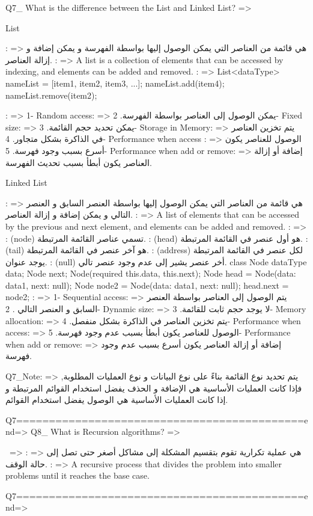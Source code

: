 Q7_ What is the difference between the List and Linked List? =>{                          
    List{
        \Arabic: => هي قائمة من العناصر التي يمكن الوصول إليها بواسطة الفهرسة و يمكن إضافة و إزالة العناصر.
        \English: => A list is a collection of elements that can be accessed by indexing, and elements can be added and removed.
        \code: => {
                List<dataType> nameList = [item1, item2, item3, ...];
                nameList.add(item4);
                nameList.remove(item2);
        }

        \Features: => {
            1- Random access: => يمكن الوصول إلى العناصر بواسطة الفهرسة.
            2- Fixed size: => يمكن تحديد حجم القائمة.
            3- Storage in Memory: => يتم تخزين العناصر في الذاكرة بشكل متجاور. 
            4- Performance when access : => الوصول للعناصر يكون أسرع بسبب وجود فهرسة.
            5- Performance when add or remove: => إضافة أو إزالة العناصر يكون أبطأ بسبب تحديث الفهرسة.
        }
    }
    Linked List {
        \Arabic: => هي قائمة من العناصر التي يمكن الوصول إليها بواسطة العنصر السابق و العنصر التالي و يمكن إضافة و إزالة العناصر.
        \English: => A list of elements that can be accessed by the previous and next element, and elements can be added and removed.
        \code: =>{
            \note\1: (node)  تسمي عناصر القائمة المرتبطة.
            \note\2: (head) هو أول عنصر في القائمة المرتبطة. 
            \note\3: (tail) هو آخر عنصر في القائمة المرتبطة.
            \note\4: (address) لكل عنصر في القائمة المرتبطة يوجد عنوان.
            \note\5: (null) أخر عنصر يشير إلى عدم وجود عنصر تالي. 
            class Node {
                dataType data;
                Node next;
                Node({required this.data, this.next});
            }
            Node head = Node({data: data1, next: null});
            Node node2 = Node({data: data1, next: null});
            head.next = node2;
        }
        \Features: => {
            1- Sequential access: => يتم الوصول إلى العناصر بواسطة العنصر السابق و العنصر التالي .
            2- Dynamic size: => لا يوجد حجم ثابت للقائمة.
            3- Memory allocation: => يتم تخزين العناصر في الذاكرة بشكل منفصل.
            4- Performance when access: => الوصول للعناصر يكون أبطأ بسبب عدم وجود فهرسة.
            5- Performance when add or remove: => إضافة أو إزالة العناصر يكون أسرع بسبب عدم وجود فهرسة.
        }

        Q7_Note: => يتم تحديد نوع القائمة بناءً على نوع البيانات و نوع العمليات المطلوبة, فإذا كانت العمليات الأساسية هي الإضافة و الحذف يفضل استخدام القوائم المرتبطة و إذا كانت العمليات الأساسية هي الوصول يفضل استخدام القوائم. 
    }   

}     
                            Q7============================================end=>
Q8_ What is Recursion algorithms? =>{
    \ => {
        \Recursion\Arabic: => هي عملية تكرارية تقوم بتقسيم المشكلة إلى مشاكل أصغر حتى تصل إلى حالة الوقف.
        \Recursion\English: => A recursive process that divides the problem into smaller problems until it reaches the base case.
    }

}
                            
                            
                            Q7============================================end=>


